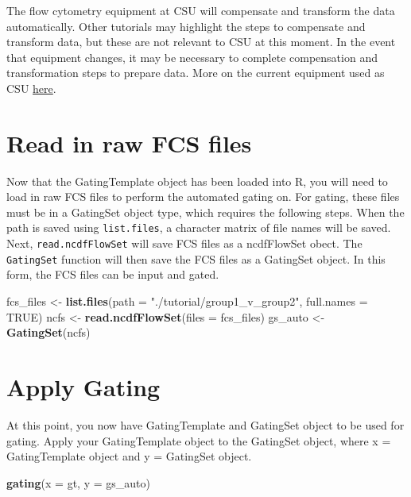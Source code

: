 \documentclass[]{book}
\newenvironment{Shaded}{\begin{snugshade}}{\end{snugshade}}
\newcommand{\DataTypeTok}[1]{\textcolor[rgb]{0.13,0.29,0.53}{#1}}
\newcommand{\KeywordTok}[1]{\textcolor[rgb]{0.13,0.29,0.53}{\textbf{#1}}}
\newcommand{\NormalTok}[1]{#1}
\newcommand{\OtherTok}[1]{\textcolor[rgb]{0.56,0.35,0.01}{#1}}
\newcommand{\StringTok}[1]{\textcolor[rgb]{0.31,0.60,0.02}{#1}}
\begin{document}
The flow cytometry equipment at CSU will compensate and transform the data automatically. Other tutorials may highlight the steps to compensate and transform data, but these are not relevant to CSU at this moment. In the event that equipment changes, it may be necessary to complete compensation and transformation steps to prepare data. More on the current equipment used as CSU \href{https://www.umassmed.edu/facslab/instrument/core-cytek-aurora2/}{here}.

\hypertarget{read-in-raw-fcs-files}{%
\section{Read in raw FCS files}\label{read-in-raw-fcs-files}}

Now that the GatingTemplate object has been loaded into R, you will need to load in raw FCS files to perform the automated gating on. For gating, these files must be in a GatingSet object type, which requires the following steps. When the path is saved using \texttt{list.files}, a character matrix of file names will be saved. Next, \texttt{read.ncdfFlowSet} will save FCS files as a ncdfFlowSet obect. The \texttt{GatingSet} function will then save the FCS files as a GatingSet object. In this form, the FCS files can be input and gated.

\begin{Shaded}
\begin{Highlighting}[]
\NormalTok{fcs_files <-}\StringTok{ }\KeywordTok{list.files}\NormalTok{(}\DataTypeTok{path =} \StringTok{"./tutorial/group1_v_group2"}\NormalTok{, }\DataTypeTok{full.names =} \OtherTok{TRUE}\NormalTok{)}
\NormalTok{ncfs  <-}\StringTok{ }\KeywordTok{read.ncdfFlowSet}\NormalTok{(}\DataTypeTok{files =}\NormalTok{ fcs_files)}
\NormalTok{gs_auto <-}\StringTok{ }\KeywordTok{GatingSet}\NormalTok{(ncfs)}
\end{Highlighting}
\end{Shaded}

\hypertarget{apply-gating}{%
\section{Apply Gating}\label{apply-gating}}

At this point, you now have GatingTemplate and GatingSet object to be used for gating. Apply your GatingTemplate object to the GatingSet object, where x = GatingTemplate object and y = GatingSet object.

\begin{Shaded}
\begin{Highlighting}[]
\KeywordTok{gating}\NormalTok{(}\DataTypeTok{x =}\NormalTok{ gt, }\DataTypeTok{y =}\NormalTok{ gs_auto)}
\end{Highlighting}
\end{Shaded}
\end{document}
